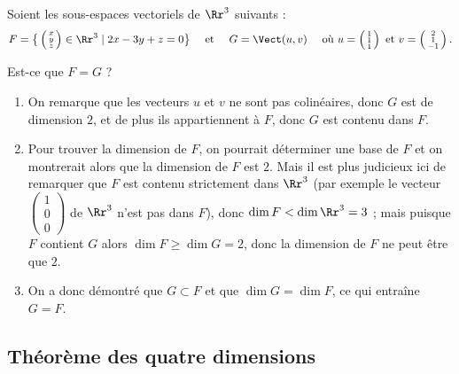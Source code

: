 \documentclass[class=report,crop=false]{standalone}
\begin{document}
\begin{exemple}
Soient les sous-espaces vectoriels de $\Rr^3$ suivants :
$$F=\big\{\left(\begin{smallmatrix}x\\y\\z\end{smallmatrix}\right) \in \Rr^{3}\mid 2x-3y+z=0\big\} \quad \text{ et } \quad
G = \Vect (u,v)\quad  \text{ où }
u=\left(\begin{smallmatrix}1\\1\\1\end{smallmatrix}\right) \text{ et }
v=\left(\begin{smallmatrix}2\\1\\-1\end{smallmatrix}\right).$$

Est-ce que $F=G$ ?

\begin{enumerate}
  \item On remarque que les vecteurs $u$ et $v$ ne sont pas colinéaires,
donc $G$ est de dimension $2$, et de plus ils appartiennent à $F$,
donc $G$ est contenu dans $F$.

  \item Pour trouver la dimension de $F$, on pourrait déterminer une base
de $F$ et on montrerait alors que la dimension de $F$ est $2$.
Mais il est plus judicieux ici de remarquer que $F$ est contenu strictement dans $\Rr^3$
(par exemple le vecteur $\left(\begin{smallmatrix}1\\0\\0\end{smallmatrix}\right)$
de $\Rr^3$ n'est pas dans $F$),
donc $\dim F < \dim \Rr^3 = 3$ ;
mais puisque $F$ contient $G$ alors $\dim F \ge \dim G = 2$,
donc la dimension de $F$ ne peut être que $2$.

  \item On a donc démontré que $G \subset F$ et que $\dim G = \dim F$,
  ce qui entraîne $G=F$.
\end{enumerate}
\end{exemple}

\subsection{Théorème des quatre dimensions}
\end{document}
